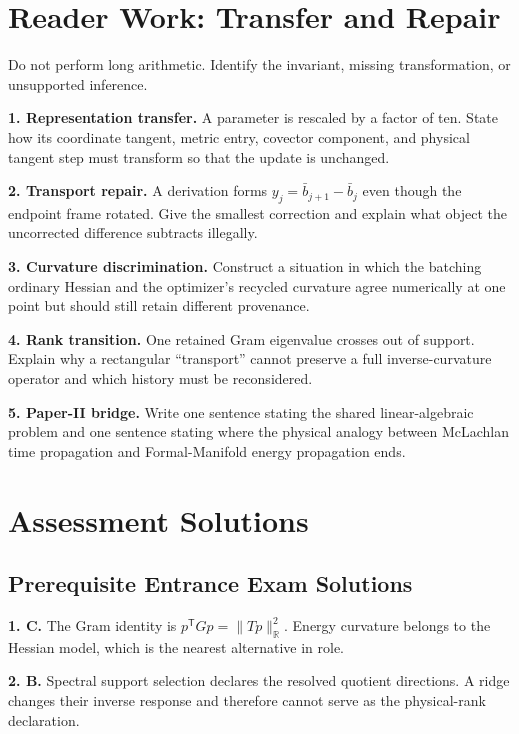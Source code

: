 \documentclass[10pt,twocolumn]{article}
\begin{document}
\clearpage
\section*{Reader Work: Transfer and Repair}

Do not perform long arithmetic. Identify the invariant, missing transformation,
or unsupported inference.

\textbf{1. Representation transfer.}
A parameter is rescaled by a factor of ten. State how its coordinate tangent,
metric entry, covector component, and physical tangent step must transform so
that the update is unchanged.

\textbf{2. Transport repair.}
A derivation forms \(y_j=\bar b_{j+1}-\bar b_j\) even though the endpoint frame
rotated. Give the smallest correction and explain what object the uncorrected
difference subtracts illegally.

\textbf{3. Curvature discrimination.}
Construct a situation in which the batching ordinary Hessian and the optimizer's
recycled curvature agree numerically at one point but should still retain
different provenance.

\textbf{4. Rank transition.}
One retained Gram eigenvalue crosses out of support. Explain why a rectangular
``transport'' cannot preserve a full inverse-curvature operator and which
history must be reconsidered.

\textbf{5. Paper-II bridge.}
Write one sentence stating the shared linear-algebraic problem and one sentence
stating where the physical analogy between McLachlan time propagation and
Formal-Manifold energy propagation ends.

\clearpage
\section*{Assessment Solutions}

\subsection*{Prerequisite Entrance Exam Solutions}

\textbf{1. C.} The Gram identity is
\(p^{\mathsf T}Gp=\|Tp\|_{\mathbb R}^2\). Energy curvature belongs to the
Hessian model, which is the nearest alternative in role.

\textbf{2. B.} Spectral support selection declares the resolved quotient
directions. A ridge changes their inverse response and therefore cannot serve
as the physical-rank declaration.
\end{document}
